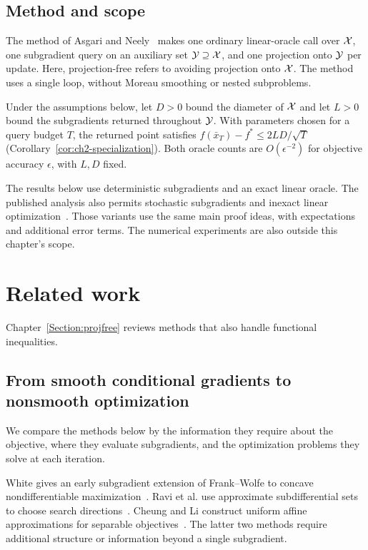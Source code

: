 \subsection{Method and scope}
\label{sec:pfdom:contributions}

The method of Asgari and Neely~\cite{asgari2024nonsmooth} makes one
ordinary linear-oracle call over $\mathcal{X}$, one subgradient query on an auxiliary
set $\mathcal{Y}\supseteq\mathcal{X}$, and one projection onto $\mathcal{Y}$ per update. Here,
projection-free refers to avoiding projection onto $\mathcal{X}$. The method uses a
single loop, without Moreau smoothing or nested subproblems.

Under the assumptions below, let $D>0$ bound the diameter of $\mathcal{X}$ and
let $L>0$ bound the subgradients returned throughout $\mathcal{Y}$. With parameters
chosen for a query budget $T$, the returned point satisfies
$f(\bar x_T)-f^*\leq2LD/\sqrt T$
(Corollary~\ref{cor:ch2-specialization}). Both oracle counts are
$O(\epsilon^{-2})$ for objective accuracy $\epsilon$, with $L,D$ fixed.

The results below use deterministic subgradients and an exact linear
oracle. The published analysis also permits stochastic subgradients and
inexact linear optimization~\cite{asgari2024nonsmooth}. Those variants use
the same main proof ideas, with expectations and additional error terms.
The numerical experiments are also outside this chapter's scope.

\section{Related work}
\label{sec:pfdom:context}
\label{sec:pfdom:related}

Chapter~\ref{Section:projfree} reviews methods that also handle
functional inequalities.

\subsection{From smooth conditional gradients to nonsmooth optimization}

We compare the methods below by the information they require about the
objective, where they evaluate subgradients, and the optimization problems
they solve at each iteration.

White gives an early subgradient extension of Frank--Wolfe to
concave nondifferentiable maximization~\cite{White1993}.
Ravi et al. use approximate subdifferential sets to choose search
directions~\cite{ravi2017deterministic}. Cheung and Li construct
uniform affine approximations for separable
objectives~\cite{cheung2018solving}. The latter two methods require additional
structure or information beyond a single subgradient.

